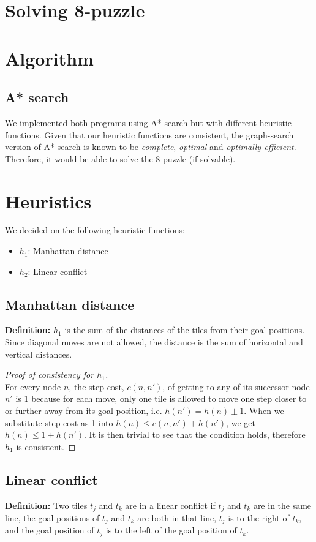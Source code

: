 \documentclass[11pt, a4paper]{article}
\begin{document}
\section*{Solving 8-puzzle}
\section{Algorithm}
\subsection{A* search}
We implemented both programs using A* search but with different heuristic functions. Given that our heuristic functions are consistent, the graph-search version of A* search is known to be \textit{complete}, \textit{optimal} and \textit{optimally efficient}. Therefore, it would be able to solve the 8-puzzle (if solvable).

\section{Heuristics}
We decided on the following heuristic functions:
\begin{itemize}
  \item $h_1$: Manhattan distance
  \item $h_2$: Linear conflict
\end{itemize}

\subsection{Manhattan distance}
\textbf{Definition:} $h_1$ is the sum of the distances of the tiles from their goal positions. Since diagonal moves are not allowed, the distance is the sum of horizontal and vertical distances.

\begin{proof}[Proof of consistency for $h_1$]
  $ $ \\
  For every node $n$, the step cost, $c(n, n')$, of getting to any of its successor node $n'$ is 1 because for each move, only one tile is allowed to move one step closer to or further away from its goal position, i.e. $h(n') = h(n) \pm 1$. When we substitute step cost as 1 into $h(n) \leq c(n, n') + h(n')$, we get $h(n) \leq 1 + h(n')$. It is then trivial to see that the condition holds, therefore $h_1$ is consistent.
\end{proof}

\subsection{Linear conflict}
\textbf{Definition:} Two tiles $t_j$ and $t_k$ are in a linear conflict if $t_j$ and $t_k$ are in the same line, the goal positions of $t_j$ and $t_k$ are both in that line, $t_j$ is to the right of $t_k$, and the goal position of $t_j$ is to the left of the goal position of $t_k$.\\
\end{document}
